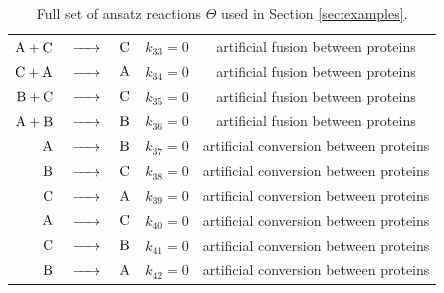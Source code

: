 \documentclass[oneside, abstracton, titlepage]{scrartcl}
\begin{document}
\begin{table}[h]
{\begin{tabular}{rclcc}
				$\ce{A + C}$ &$\ce{->}$& $\ce{C}$ & $k_{33} = 0$ & artificial fusion between proteins\\
				$\ce{C + A}$ &$\ce{->}$& $\ce{A}$ & $k_{34} = 0$ & artificial fusion between proteins\\
				$\ce{B + C}$ &$\ce{->}$& $\ce{C}$ & $k_{35} = 0$ & artificial fusion between proteins\\
				$\ce{A + B}$ &$\ce{->}$& $\ce{B}$ & $k_{36} = 0$ & artificial fusion between proteins\\
				$\ce{A}$ &$\ce{->}$& $\ce{B}$ & $k_{37} = 0$ & artificial conversion between proteins\\
				$\ce{B}$ &$\ce{->}$& $\ce{C}$ & $k_{38} = 0$ & artificial conversion between proteins\\
				$\ce{C}$ &$\ce{->}$& $\ce{A}$ & $k_{39} = 0$ & artificial conversion between proteins\\
				$\ce{A}$ &$\ce{->}$& $\ce{C}$ & $k_{40} = 0$ & artificial conversion between proteins\\
				$\ce{C}$ &$\ce{->}$& $\ce{B}$ & $k_{41} = 0$ & artificial conversion between proteins\\
				$\ce{B}$ &$\ce{->}$& $\ce{A}$ & $k_{42} = 0$ & artificial conversion between proteins
			\end{tabular}
		}
		\caption{Full set of ansatz reactions $\Theta$ used in Section \ref{sec:examples}.}
		\label{tab:reaction-library}
	\end{table}
\end{document}
